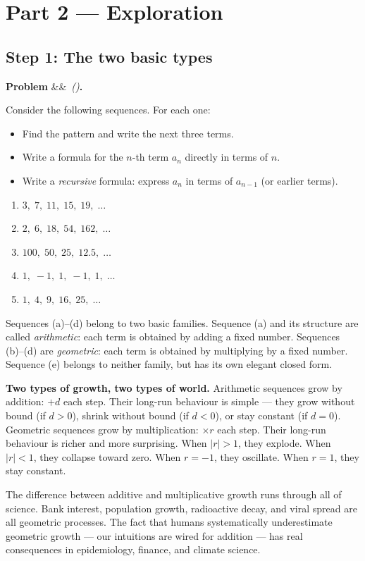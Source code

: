 \documentclass[12pt, a4paper]{article}
\newcounter{problem}
\newenvironment{problem}[1][]{%
  \refstepcounter{problem}%
  \par\vspace{6pt}%
  \noindent\textbf{\color{MidBlue}Problem \theproblem}%
  \ifx&#1&\else\ \textit{(#1)}\fi\textbf{.}\enskip
}{\par\vspace{4pt}}
\begin{document}
\section{Part 2 \texorpdfstring{---}{--} Exploration}

\subsection{Step 1: The two basic types}

\begin{problem}
\label{prob:arith_geom}
Consider the following sequences. For each one:
\begin{itemize}[topsep=2pt, noitemsep]
  \item Find the pattern and write the next three terms.
  \item Write a formula for the $n$-th term $a_n$ directly in terms of $n$.
  \item Write a \emph{recursive} formula: express $a_n$ in terms of $a_{n-1}$ (or earlier terms).
\end{itemize}

\begin{enumerate}[label=(\alph*), topsep=4pt]
  \item $3,\; 7,\; 11,\; 15,\; 19,\; \ldots$
  \item $2,\; 6,\; 18,\; 54,\; 162,\; \ldots$
  \item $100,\; 50,\; 25,\; 12.5,\; \ldots$
  \item $1,\; -1,\; 1,\; -1,\; 1,\; \ldots$
  \item $1,\; 4,\; 9,\; 16,\; 25,\; \ldots$
\end{enumerate}
\end{problem}

\medskip
Sequences (a)--(d) belong to two basic families. Sequence (a) and its structure are called \emph{arithmetic}: each term is obtained by adding a fixed number. Sequences (b)--(d) are \emph{geometric}: each term is obtained by multiplying by a fixed number. Sequence (e) belongs to neither family, but has its own elegant closed form.

\begin{thought}
\textbf{Two types of growth, two types of world.}
Arithmetic sequences grow by addition: $+d$ each step. Their long-run behaviour is simple --- they grow without bound (if $d > 0$), shrink without bound (if $d < 0$), or stay constant (if $d = 0$). Geometric sequences grow by multiplication: $\times r$ each step. Their long-run behaviour is richer and more surprising. When $|r| > 1$, they explode. When $|r| < 1$, they collapse toward zero. When $r = -1$, they oscillate. When $r = 1$, they stay constant.

The difference between additive and multiplicative growth runs through all of science. Bank interest, population growth, radioactive decay, and viral spread are all geometric processes. The fact that humans systematically underestimate geometric growth --- our intuitions are wired for addition --- has real consequences in epidemiology, finance, and climate science.
\end{thought}
\end{document}
